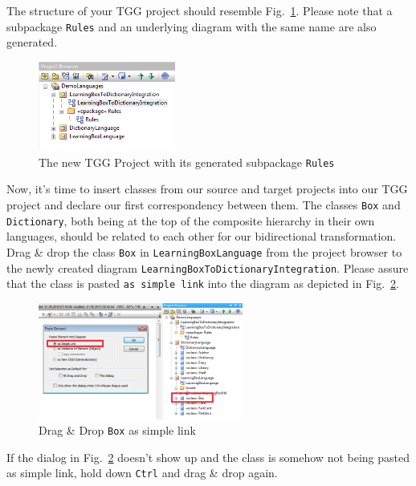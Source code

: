 The structure of your TGG project should resemble
Fig.~\ref{fig:new_tgg_project}. Please note that a subpackage \texttt{Rules} and an underlying diagram with the same name are
also generated.

\begin{figure}[htbp]
\begin{center}
  \includegraphics[width=0.4\textwidth]{pics/tggBilder/tgg3}
  \caption{The new TGG Project with its generated subpackage \texttt{Rules}}  
  \label{fig:new_tgg_project}
\end{center}
\end{figure}

Now, it's time to insert classes from our source and target projects
into our TGG project and declare our first correspondency between them. The
classes \texttt{Box} and \texttt{Dictionary}, both being at the top of the composite hierarchy in their own languages,
should be related to each other for our bidirectional transformation. Drag
\& drop the class \texttt{Box} in \texttt{Learning\-Box\-Language} from the project 
browser to the newly created diagram
\texttt{Learning\-Box\-To\-Dictionary\-Integration}. Please assure that the
class is pasted \texttt{as simple link} into the diagram as depicted in
Fig.~\ref{fig:drag_drop_box}. 

\begin{figure}[htbp]
\begin{center}
  \includegraphics[width=0.6\textwidth]{pics/tggBilder/tgg4}
  \caption{Drag \& Drop \texttt{Box} as simple link} 
  \label{fig:drag_drop_box}
\end{center}
\end{figure}

If the dialog in Fig.~\ref{fig:drag_drop_box} doesn't show up
and the class is somehow not being pasted as simple link, hold down
\texttt{Ctrl} and drag \& drop again.

